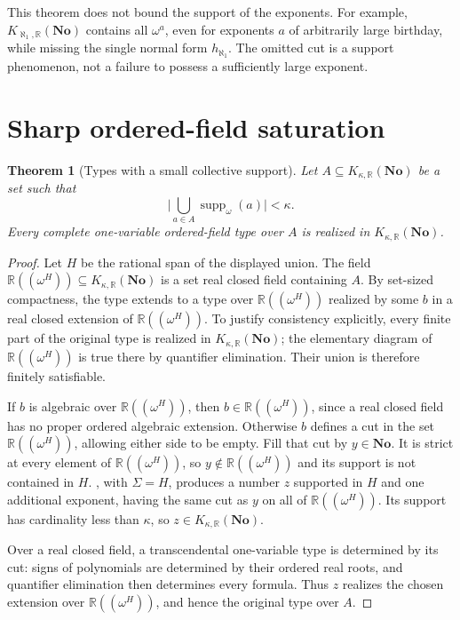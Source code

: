 \documentclass[11pt,letterpaper]{article}
\numberwithin{equation}{section}
\newtheorem{theorem}{Theorem}[section]
\theoremstyle{definition}
\theoremstyle{remark}
\newcommand{\R}{\mathbb R}
\newcommand{\No}{\mathbf{No}}
\newcommand{\suppw}{\operatorname{supp}_{\omega}}
\newcommand{\card}[1]{\lvert #1\rvert}
\newcommand{\KN}[2]{K_{#1,#2}(\No)}%
\begin{document}
This theorem does not bound the support of the exponents. For example, $\KN{\aleph_1}\R$ contains all $\omega^a$, even for exponents $a$ of arbitrarily large birthday, while missing the single normal form $h_{\aleph_1}$. The omitted cut is a support phenomenon, not a failure to possess a sufficiently large exponent.

\section{Sharp ordered-field saturation}\label{fkc:sb:sec:saturation}

\begin{theorem}[Types with a small collective support]\label{fkc:sb:thm:supporttypes}
Let $A\subseteq\KN\kappa\R$ be a set such that
\[
 \card{\bigcup_{a\in A}\suppw(a)}<\kappa.
\]
Every complete one-variable ordered-field type over $A$ is realized in $\KN\kappa\R$.
\end{theorem}
\begin{proof}
Let $H$ be the rational span of the displayed union. The field $\R((\omega^H))\subseteq\KN\kappa\R$ is a set real closed field containing $A$. By set-sized compactness, the type extends to a type over $\R((\omega^H))$ realized by some $b$ in a real closed extension of $\R((\omega^H))$. To justify consistency explicitly, every finite part of the original type is realized in $\KN\kappa\R$; the elementary diagram of $\R((\omega^H))$ is true there by quantifier elimination. Their union is therefore finitely satisfiable.

If $b$ is algebraic over $\R((\omega^H))$, then $b\in\R((\omega^H))$, since a real closed field has no proper ordered algebraic extension. Otherwise $b$ defines a cut in the set $\R((\omega^H))$, allowing either side to be empty. Fill that cut by $y\in\No$. It is strict at every element of $\R((\omega^H))$, so $y\notin\R((\omega^H))$ and its support is not contained in $H$. , with $\Sigma=H$, produces a number $z$ supported in $H$ and one additional exponent, having the same cut as $y$ on all of $\R((\omega^H))$. Its support has cardinality less than $\kappa$, so $z\in\KN\kappa\R$.

Over a real closed field, a transcendental one-variable type is determined by its cut: signs of polynomials are determined by their ordered real roots, and quantifier elimination then determines every formula. Thus $z$ realizes the chosen extension over $\R((\omega^H))$, and hence the original type over $A$.
\end{proof}
\end{document}
